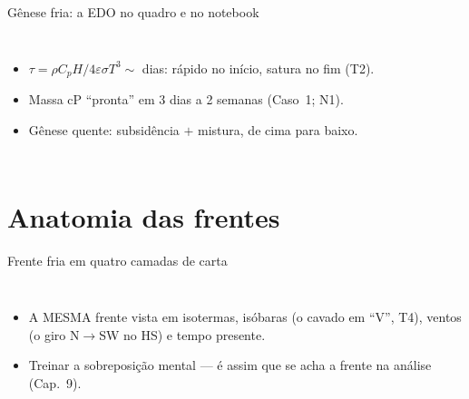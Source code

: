 \documentclass[aspectratio=169,11pt]{beamer}
\begin{document}
\begin{frame}{Gênese fria: a EDO no quadro e no notebook}
  \begin{columns}
    \vspace{0.4em}
    \begin{itemize}
      \item $\tau = \rho C_pH/4\varepsilon\sigma T^3 \sim$ dias:
            rápido no início, satura no fim (T2).
      \item Massa cP ``pronta'' em 3 dias a 2 semanas (Caso~1; N1).
      \item Gênese quente: subsidência $+$ mistura, de cima para
            baixo.
    \end{itemize}
  \end{columns}
\end{frame}

\section{Anatomia das frentes}

\begin{frame}{Frente fria em quatro camadas de carta}
  \begin{columns}
    \begin{itemize}
      \item A MESMA frente vista em isotermas, isóbaras (o cavado em
            ``V'', T4), ventos (o giro N$\to$SW no HS) e tempo
            presente.
      \item Treinar a sobreposição mental — é assim que se acha a
            frente na análise (Cap.~9).
    \end{itemize}
  \end{columns}
\end{frame}
\end{document}

